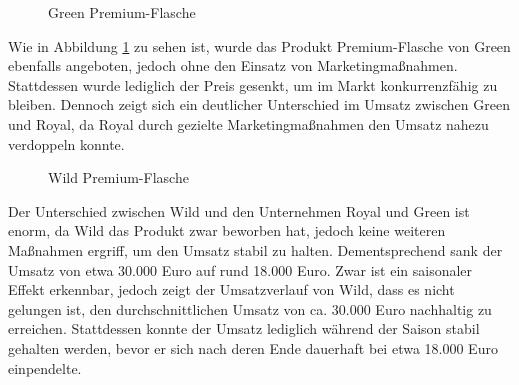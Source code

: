 \documentclass[a4paper,12pt]{article}
\begin{document}
\begin{figure}[H]
    \centering
    \caption{Green Premium-Flasche}
    \label{fig:Green Premium-Flasche}
\end{figure}
Wie in Abbildung \ref{fig:Green Premium-Flasche} zu sehen ist, wurde das Produkt Premium-Flasche von Green ebenfalls angeboten, 
jedoch ohne den Einsatz von Marketingmaßnahmen.
Stattdessen wurde lediglich der Preis gesenkt, um im Markt konkurrenzfähig zu bleiben.
Dennoch zeigt sich ein deutlicher Unterschied im Umsatz zwischen Green und Royal,
da Royal durch gezielte Marketingmaßnahmen den Umsatz nahezu verdoppeln konnte.
\begin{figure}[H]
    \centering
    \caption{Wild Premium-Flasche}
    \label{fig:Wild Premium-Flasche}
\end{figure}
Der Unterschied zwischen Wild und den Unternehmen Royal und Green ist enorm, da Wild das Produkt zwar beworben hat,
jedoch keine weiteren Maßnahmen ergriff, um den Umsatz stabil zu halten.
Dementsprechend sank der Umsatz von etwa 30.000 Euro auf rund 18.000 Euro.
Zwar ist ein saisonaler Effekt erkennbar, jedoch zeigt der Umsatzverlauf von Wild, dass es nicht gelungen ist,
den durchschnittlichen Umsatz von ca. 30.000 Euro nachhaltig zu erreichen.
Stattdessen konnte der Umsatz lediglich während der Saison stabil gehalten werden,
bevor er sich nach deren Ende dauerhaft bei etwa 18.000 Euro einpendelte.
\end{document}
